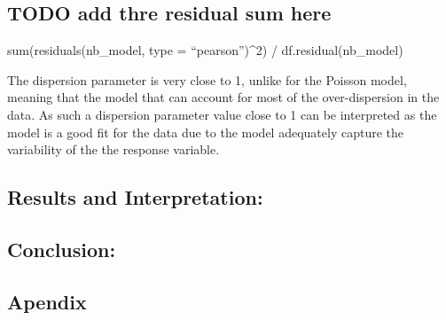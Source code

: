 \documentclass[
  letterpaper,
  DIV=11,
  numbers=noendperiod]{scrartcl}
\newenvironment{Shaded}{\begin{snugshade}}{\end{snugshade}}
\newcommand{\AttributeTok}[1]{\textcolor[rgb]{0.40,0.45,0.13}{#1}}
\newcommand{\DecValTok}[1]{\textcolor[rgb]{0.68,0.00,0.00}{#1}}
\newcommand{\DocumentationTok}[1]{\textcolor[rgb]{0.37,0.37,0.37}{\textit{#1}}}
\newcommand{\FunctionTok}[1]{\textcolor[rgb]{0.28,0.35,0.67}{#1}}
\newcommand{\NormalTok}[1]{\textcolor[rgb]{0.00,0.23,0.31}{#1}}
\newcommand{\SpecialCharTok}[1]{\textcolor[rgb]{0.37,0.37,0.37}{#1}}
\newcommand{\StringTok}[1]{\textcolor[rgb]{0.13,0.47,0.30}{#1}}
\begin{document}
\hypertarget{todo-add-thre-residual-sum-here}{%
\subsection{TODO add thre residual sum
here}\label{todo-add-thre-residual-sum-here}}

sum(residuals(nb\_model, type = ``pearson'')\^{}2) /
df.residual(nb\_model)

The dispersion parameter is very close to 1, unlike for the Poisson
model, meaning that the model that can account for most of the
over-dispersion in the data. As such a dispersion parameter value close
to 1 can be interpreted as the model is a good fit for the data due to
the model adequately capture the variability of the the response
variable.

\hypertarget{results-and-interpretation}{%
\subsection{Results and
Interpretation:}\label{results-and-interpretation}}

\hypertarget{conclusion}{%
\subsection{Conclusion:}\label{conclusion}}

\hypertarget{apendix}{%
\subsection{Apendix}\label{apendix}}

\begin{Shaded}
\end{Shaded}
\end{document}
